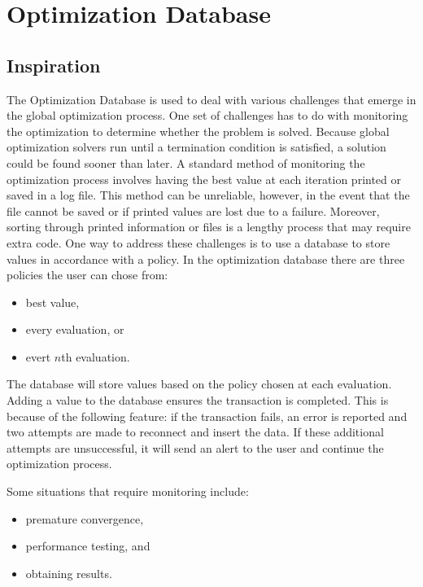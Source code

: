 \section{Optimization Database}
\label{database}
\subsection{Inspiration}
The Optimization Database is used to deal with various challenges that emerge in the global optimization process. One set of challenges has to do with monitoring the optimization to determine whether the problem is solved. Because global optimization solvers run until a termination condition is satisfied, a solution could be found sooner than later. A standard method of monitoring the optimization process involves having the best value at each iteration printed or saved in a log file. This method can be unreliable, however, in the event that the file cannot be saved or if printed values are lost due to a failure. Moreover, sorting through printed information or files is a lengthy process that may require extra code. One way to address these challenges is to use a database to store values in accordance with a policy. In the optimization database there are three policies the user can chose from:
\begin{itemize}
    \item best value, 
    \item every evaluation, or
    \item evert $n$th evaluation.
\end{itemize}
The database will store values based on the policy chosen at each evaluation. Adding a value to the database ensures the transaction is completed. This is because of the following feature: if the transaction fails, an error is reported and two attempts are made to reconnect and insert the data. If these additional attempts are unsuccessful, it will send an alert to the user and continue the optimization process. 

 
Some situations that require monitoring include:
\begin{itemize}
    \item premature convergence, 
    \item performance testing, and
    \item obtaining results.
\end{itemize}

